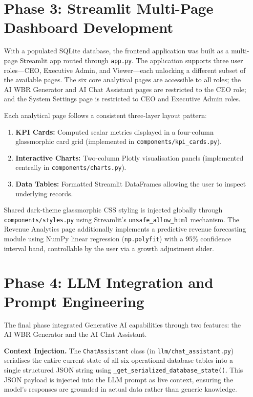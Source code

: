 \documentclass{book}
\begin{document}
\section{Phase 3: Streamlit Multi-Page Dashboard Development}
With a populated SQLite database, the frontend application was built as a multi-page Streamlit app routed through \texttt{app.py}. The application supports three user roles---CEO, Executive Admin, and Viewer---each unlocking a different subset of the available pages. The six core analytical pages are accessible to all roles; the AI WBR Generator and AI Chat Assistant pages are restricted to the CEO role; and the System Settings page is restricted to CEO and Executive Admin roles.

\par\noindent
Each analytical page follows a consistent three-layer layout pattern:
\begin{enumerate}
    \item \textbf{KPI Cards:} Computed scalar metrics displayed in a four-column glassmorphic card grid (implemented in \texttt{components/kpi\_cards.py}).
    \item \textbf{Interactive Charts:} Two-column Plotly visualisation panels (implemented centrally in \texttt{components/charts.py}).
    \item \textbf{Data Tables:} Formatted Streamlit DataFrames allowing the user to inspect underlying records.
\end{enumerate}

\par\noindent
Shared dark-theme glassmorphic CSS styling is injected globally through \texttt{components/styles.py} using Streamlit's \texttt{unsafe\_allow\_html} mechanism. The Revenue Analytics page additionally implements a predictive revenue forecasting module using NumPy linear regression (\texttt{np.polyfit}) with a 95\% confidence interval band, controllable by the user via a growth adjustment slider.

\section{Phase 4: LLM Integration and Prompt Engineering}
The final phase integrated Generative AI capabilities through two features: the AI WBR Generator and the AI Chat Assistant.

\par\noindent
\textbf{Context Injection.} The \texttt{ChatAssistant} class (in \texttt{llm/chat\_assistant.py}) serialises the entire current state of all six operational database tables into a single structured JSON string using \texttt{\_get\_serialized\_database\_state()}. This JSON payload is injected into the LLM prompt as live context, ensuring the model's responses are grounded in actual data rather than generic knowledge.
\end{document}
